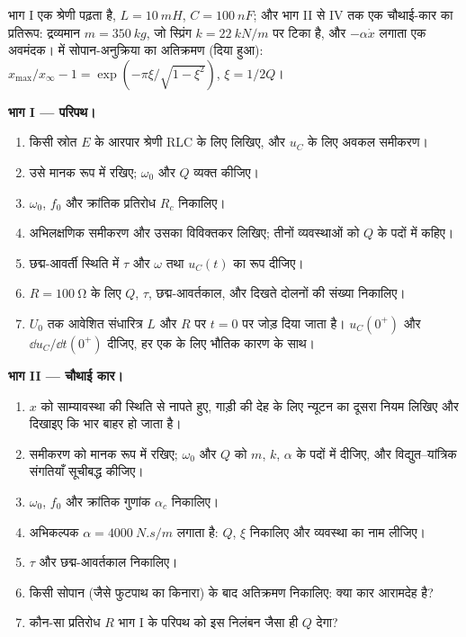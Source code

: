 \begin{problem}
\label{pb:b1:transient-regimes:1}
भाग I एक श्रेणी  पढ़ता है, $L = \qty{10}{mH}$, $C = \qty{100}{nF}$;
और भाग II से IV तक एक चौथाई-कार का प्रतिरूप: द्रव्यमान $m = \qty{350}{kg}$, जो
स्प्रिंग $k = \qty{22}{kN/m}$ पर टिका है, और $-\alpha\dot x$ लगाता एक अवमंदक।
 में सोपान-अनुक्रिया का अतिक्रमण (दिया हुआ):
$x_{\max}/x_\infty - 1 = \exp(-\pi\xi/\sqrt{1 - \xi^2})$, $\xi = 1/2Q$।

\medskip
\noindent\textbf{भाग I --- परिपथ।}
\begin{enumerate}
  \item किसी स्रोत $E$ के आरपार श्रेणी RLC के लिए  लिखिए, और
        $u_C$ के लिए अवकल समीकरण।
  \item उसे मानक रूप में रखिए; $\omega_0$ और $Q$ व्यक्त कीजिए।
  \item $\omega_0$, $f_0$ और क्रांतिक प्रतिरोध $R_c$ निकालिए।
  \item अभिलक्षणिक समीकरण और उसका विविक्तकर लिखिए; तीनों व्यवस्थाओं को
        $Q$ के पदों में कहिए।
  \item छद्म-आवर्ती स्थिति में $\tau$ और $\omega$ तथा $u_C(t)$ का
        रूप दीजिए।
  \item $R = \qty{100}{\ohm}$ के लिए $Q$, $\tau$, छद्म-आवर्तकाल,
        और दिखते दोलनों की संख्या निकालिए।
  \item $U_0$ तक आवेशित संधारित्र $L$ और $R$ पर $t = 0$ पर जोड़ दिया
        जाता है। $u_C(0^+)$ और $\dd u_C/\dd t(0^+)$ दीजिए, हर एक के लिए
        भौतिक कारण के साथ।
\end{enumerate}

\medskip
\noindent\textbf{भाग II --- चौथाई कार।}
\begin{enumerate}[resume]
  \item $x$ को साम्यावस्था की स्थिति से नापते हुए, गाड़ी की देह के लिए
        न्यूटन का दूसरा नियम लिखिए और दिखाइए कि भार बाहर हो जाता है।
  \item समीकरण को मानक रूप में रखिए; $\omega_0$ और $Q$ को
        $m$, $k$, $\alpha$ के पदों में दीजिए, और विद्युत--यांत्रिक
        संगतियाँ सूचीबद्ध कीजिए।
  \item $\omega_0$, $f_0$ और क्रांतिक गुणांक
        $\alpha_c$ निकालिए।
  \item अभिकल्पक $\alpha = \qty{4000}{N.s/m}$ लगाता है: $Q$,
        $\xi$ निकालिए और व्यवस्था का नाम लीजिए।
  \item $\tau$ और छद्म-आवर्तकाल निकालिए।
  \item किसी सोपान (जैसे फुटपाथ का किनारा) के बाद अतिक्रमण निकालिए: क्या
        कार आरामदेह है?
  \item कौन-सा प्रतिरोध $R$ भाग I के परिपथ को इस निलंबन जैसा ही
        $Q$ देगा?
\end{enumerate}


\end{problem}
